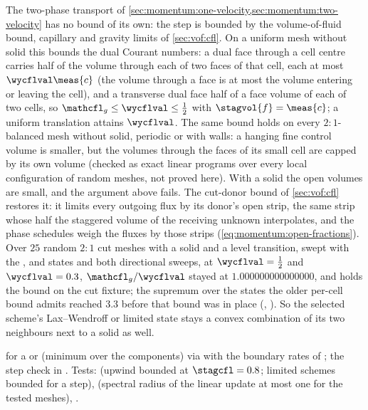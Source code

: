 The two-phase transport of \cref{sec:momentum:one-velocity,sec:momentum:two-velocity}
has no bound of its own: the step is bounded by the volume-of-fluid bound,
capillary and gravity limits of \cref{sec:vof:cfl}. On a uniform mesh
without solid this bounds the dual Courant numbers: a dual face through a
cell centre carries half of the volume through each of two faces of that
cell, each at most $\wycflval\meas{c}$ (the volume through a face is at most
the volume entering or leaving the cell), and a transverse dual face half of a
face volume of each of two cells, so $\mathcfl_g\le\wycflval\le\half$
with $\stagvol{f}=\meas{c}$; a uniform translation attains $\wycflval$. The same
bound holds on every $2{:}1$-balanced mesh without solid, periodic or with
walls: a hanging fine control volume is smaller, but the volumes through the
faces of its small cell are capped by its own volume (checked as exact linear
programs over every local configuration of random meshes, not proved here).
With a solid the open volumes are small, and the argument above fails. The
cut-donor bound of \cref{sec:vof:cfl} restores it: it limits every outgoing
flux by its donor's open strip, the same strip whose half the staggered
volume of the receiving unknown interpolates, and the phase schedules weigh
the fluxes by those strips (\cref{eq:momentum:open-fractions}). Over $25$
random $2{:}1$ cut meshes with a solid and a level transition, swept with the
,  and 
states and both directional sweeps, at $\wycflval=\half$ and
$\wycflval=0.3$, $\mathcfl_g/\wycflval$ stayed at $1.000000000000000$, and
holds the bound on the cut fixture; the supremum over the states the older
per-cell bound admits reached $3.3$ before that bound was in place
(, ). So the selected scheme's
Lax--Wendroff or limited state stays a convex combination of its two
neighbours next to a solid as well.

\begin{implnote}
 for a
 or
 (minimum over the
components) via 
with the boundary rates of ;
the step check in .
Tests: 
(upwind bounded at $\stagcfl=0.8$; limited schemes bounded for a step),
(spectral radius of the linear update at most one for the tested meshes),
.
\end{implnote}

